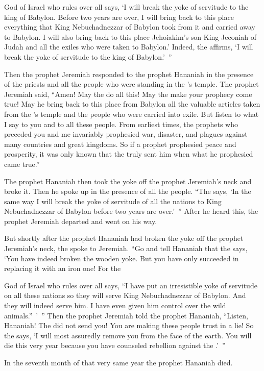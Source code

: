 {{}
God
of Israel
who rules over all
says,
‘I will break
the yoke of servitude
to the king
of Babylon.
Before
two years
are over,
I
will bring back
to
this
place
everything
that
King
Nebuchadnezzar
of Babylon
took
from it
and carried
away to Babylon.
I
will also bring back
to
this
place
Jehoiakim’s
son
King
Jeconiah
of Judah
and all
the exiles
who were taken
to Babylon.’
Indeed,
the {}
affirms, ‘I will break
the yoke
of servitude to the king
of Babylon.’ ”
\par }{\PP {}Then the prophet
Jeremiah
responded to the prophet
Hananiah
in the presence
of the priests
and all
the people
who were standing
in the
{}’s
temple.
The prophet
Jeremiah
said,
“Amen! May the
{}
do
all this! May the
{}
make
your prophecy
come true! May he bring back
to
this
place
from Babylon
all the valuable articles
taken from the
{}’s
temple
and the people
who were carried into exile.
But
listen
to what
I
say
to you and to all
these people.
From
earliest times,
the prophets
who
preceded
you and me
invariably
prophesied
war,
disaster,
and plagues
against
many
countries
and great
kingdoms.
So if
a prophet
prophesied
peace
and prosperity, it
was only known
that
the {}
truly sent
him when what
he prophesied
came
true.”
\par }{\PP {}The prophet
Hananiah
then took
the yoke
off the prophet
Jeremiah’s
neck
and broke it.
Then he spoke
up in the presence
of all
the people.
“The
{}
says,
‘In the same
way I will break
the
yoke
of servitude
of all
the nations
to King
Nebuchadnezzar
of Babylon
before
two years
are over.’ ”
After he heard this, the prophet
Jeremiah
departed
and went on his way.
\par }{\PP {}But shortly
after
the prophet
Hananiah
had broken
the yoke
off
the prophet
Jeremiah’s
neck,
the {}
spoke
to
Jeremiah.
“Go
and tell
Hananiah
that the
{}
says, ‘You have indeed broken
the wooden
yoke.
But you have
only succeeded in replacing
it with an iron one!
For
the

{}
God
of Israel
who rules over all
says, “I have put
an irresistible
yoke
of servitude
on
all
these
nations
so
they will serve
King
Nebuchadnezzar
of Babylon.
And they will indeed serve
him. I have even
given
him control over the
wild
animals.” ’ ”
Then the prophet
Jeremiah
told
the prophet
Hananiah,
“Listen,
Hananiah! The
{}
did not
send
you! You are
making these
people
trust
in a lie!
So
the {}
says,
‘I
will most assuredly
remove you from the face
of the earth.
You will die
this very year
because
you have
counseled
rebellion against the
{}.’ ”
\par }{\PP {}In the seventh
month
of that very same year
the prophet
Hananiah
died.

}
